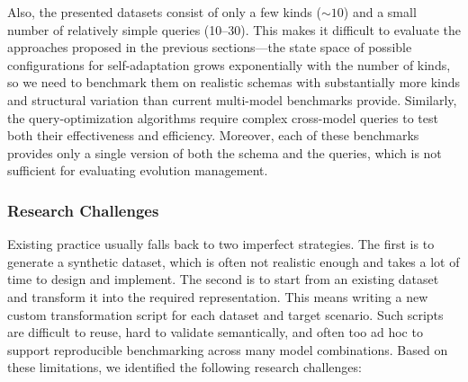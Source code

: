 Also, the presented datasets consist of only a few kinds (${\sim} 10$) and a small number of relatively simple queries (10--30). This makes it difficult to evaluate the approaches proposed in the previous sections---the state space of possible configurations for self-adaptation grows exponentially with the number of kinds, so we need to benchmark them on realistic schemas with substantially more kinds and structural variation than current multi-model benchmarks provide. Similarly, the query-optimization algorithms require complex cross-model queries to test both their effectiveness and efficiency. Moreover, each of these benchmarks provides only a single version of both the schema and the queries, which is not sufficient for evaluating evolution management.

\subsubsection{Research Challenges}

Existing practice usually falls back to two imperfect strategies. The first is to generate a synthetic dataset, which is often not realistic enough and takes a lot of time to design and implement. The second is to start from an existing dataset and transform it into the required representation. This means writing a new custom transformation script for each dataset and target scenario. Such scripts are difficult to reuse, hard to validate semantically, and often too ad hoc to support reproducible benchmarking across many model combinations. Based on these limitations, we identified the following research challenges:





